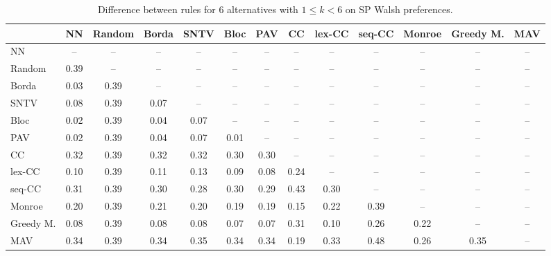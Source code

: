 
\begin{table*}[h!]
\centering
\begin{tabular}{lcccccccccccc}
\toprule
 & NN & Random & Borda & SNTV & Bloc & PAV & CC & lex-CC & seq-CC & Monroe & Greedy M. & MAV \\
\midrule
NN & -- & -- & -- & -- & -- & -- & -- & -- & -- & -- & -- & -- \\
Random & 0.39 & -- & -- & -- & -- & -- & -- & -- & -- & -- & -- & -- \\
Borda & 0.03 & 0.39 & -- & -- & -- & -- & -- & -- & -- & -- & -- & -- \\
SNTV & 0.08 & 0.39 & 0.07 & -- & -- & -- & -- & -- & -- & -- & -- & -- \\
Bloc & 0.02 & 0.39 & 0.04 & 0.07 & -- & -- & -- & -- & -- & -- & -- & -- \\
PAV & 0.02 & 0.39 & 0.04 & 0.07 & 0.01 & -- & -- & -- & -- & -- & -- & -- \\
CC & 0.32 & 0.39 & 0.32 & 0.32 & 0.30 & 0.30 & -- & -- & -- & -- & -- & -- \\
lex-CC & 0.10 & 0.39 & 0.11 & 0.13 & 0.09 & 0.08 & 0.24 & -- & -- & -- & -- & -- \\
seq-CC & 0.31 & 0.39 & 0.30 & 0.28 & 0.30 & 0.29 & 0.43 & 0.30 & -- & -- & -- & -- \\
Monroe & 0.20 & 0.39 & 0.21 & 0.20 & 0.19 & 0.19 & 0.15 & 0.22 & 0.39 & -- & -- & -- \\
Greedy M. & 0.08 & 0.39 & 0.08 & 0.08 & 0.07 & 0.07 & 0.31 & 0.10 & 0.26 & 0.22 & -- & -- \\
MAV & 0.34 & 0.39 & 0.34 & 0.35 & 0.34 & 0.34 & 0.19 & 0.33 & 0.48 & 0.26 & 0.35 & -- \\
\bottomrule
\end{tabular}

\caption{Difference between rules for 6 alternatives with $1 \leq k < 6$ on SP Walsh preferences.}
\end{table*}
